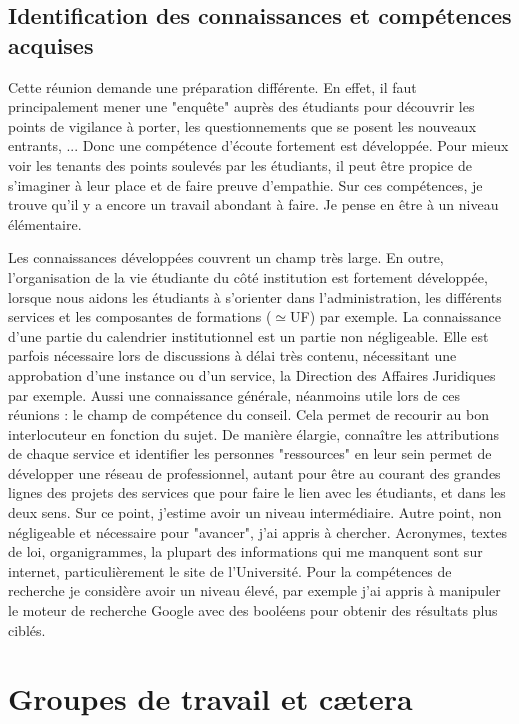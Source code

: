 \documentclass{article}
\begin{document}
\subsection{Identification des connaissances et compétences acquises}
Cette réunion demande une préparation différente. 
En effet, il faut principalement mener une "enquête" auprès des étudiants pour découvrir les points de vigilance à porter, les questionnements que se posent les nouveaux entrants, ... 
Donc une compétence d'écoute fortement est développée. 
Pour mieux voir les tenants des points soulevés par les étudiants, il peut être propice de s'imaginer à leur place et de faire preuve d'empathie. 
Sur ces compétences, je trouve qu'il y a encore un travail abondant à faire. 
Je pense en être à un niveau élémentaire. \par 
Les connaissances développées couvrent un champ très large. 
En outre, l'organisation de la vie étudiante du côté institution est fortement développée, lorsque nous aidons les étudiants à s'orienter dans l'administration, les différents services et les composantes de formations ($\simeq$UF) par exemple. 
La connaissance d'une partie du calendrier institutionnel est un partie non négligeable. 
Elle est parfois nécessaire lors de discussions à délai très contenu, nécessitant une approbation d'une instance ou d'un service, la Direction des Affaires Juridiques par exemple.
Aussi une connaissance générale, néanmoins utile lors de ces réunions : le champ de compétence du conseil. 
Cela permet de recourir au bon interlocuteur en fonction du sujet. 
De manière élargie, connaître les attributions de chaque service et identifier les personnes "ressources" en leur sein permet de développer une réseau de professionnel, autant pour être au courant des grandes lignes des projets des services que pour faire le lien avec les étudiants, et dans les deux sens. Sur ce point, j'estime avoir un niveau intermédiaire.
Autre point, non négligeable et nécessaire pour "avancer", j'ai appris à chercher. 
Acronymes, textes de loi, organigrammes, la plupart des informations qui me manquent sont sur internet, particulièrement le site de l'Université. 
Pour la compétences de recherche je considère avoir un niveau élevé, par exemple j'ai appris à manipuler le moteur de recherche Google avec des booléens pour obtenir des résultats plus ciblés.
\newpage

\section{Groupes de travail et cætera}
\end{document}
